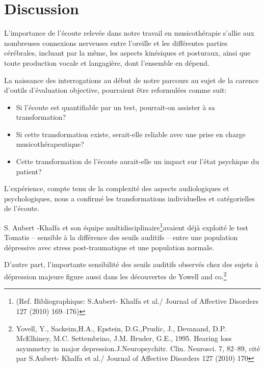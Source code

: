 \chapter{Discussion}

L'importance de l'écoute relevée dans notre travail en musicothérapie
s'allie aux nombreuses connexions nerveuses entre l'oreille et les
différentes parties cérébrales, incluant par la même, les aspects kinésiques
et posturaux, ainsi que toute production vocale et langagière,
dont l'ensemble en dépend.


La naissance des interrogations au début de notre parcours au
sujet de la carence d'outils d'évaluation objective, pourraient être 
reformulées comme suit:
\begin{itemize}
     \item 
       Si l'écoute est quantifiable  par un test, pourrait-on assister à sa
transformation?
\item Si cette transformation existe, serait-elle reliable avec
une prise en charge musicothérapeutique?
\item Cette transformation de l'écoute aurait-elle un impact sur l'état
psychique du patient? %
\end{itemize}
L'expérience, compte tenu de la
complexité des aspects audiologiques et psychologiques, 
 nous a confirmé les transformations individuelles et
catégorielles de l'écoute.

S. Aubert -Khalfa et son équipe multidisciplinaire\footnote{ (Ref. Bibliographique: S.Aubert- Khalfa
et al./ Journal of Affective Disorders 127 (2010) 169--176)}avaient déjà
exploité le test Tomatis -- sensible à la différence des
seuils auditifs -- entre une population
dépressive avec stress post-traumatique et une population normale.


D'autre part, l'importante sensibilité des seuils auditifs observés chez des
sujets à dépression majeure figure aussi dans les découvertes de Yowell and co.\footnote{Yovell, Y.,
  Sackeim,H.A., Epstein, D.G.,Prudic, J., Devanand, D.P. McElhiney,
  M.C. Settembrino, J.M. Bruder, G.E., 1995. Hearing loss asymmetry in
  major depression.J.Neuropsychitr. Clin. Neurosci. 7, 82--89, cité
  par S.Aubert- Khalfa et al./ Journal of Affective Disorders 127
  (2010) 170  }

